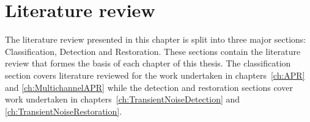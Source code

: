 \chapter{Literature review}\label{ch:LiteratureReview}

\ifpdf
    \graphicspath{{Chapter2_LitReview/Chapter2Figs/PNG/}{Chapter2_LitReview/Chapter2Figs/PDF/}{Chapter2_LitReview/Chapter2Figs/}{Chapter2_LitReview/Chapter2Figs/Classification/}{Chapter2_LitReview/Chapter2Figs/Detection/}{Chapter2_LitReview/Chapter2Figs/Restoration}}
\else
    \graphicspath{{Chapter2_LitReview/Chapter2Figs/EPS/}{Chapter2_LitReview/Chapter2Figs/}}
\fi

The literature review presented in this chapter is split into three major sections: Classification, Detection and Restoration. These sections contain the literature review that formes the basis of each chapter of this thesis. The classification section covers literature reviewed for the work undertaken in chapters~\ref{ch:APR} and \ref{ch:MultichannelAPR} while the detection and restoration sections cover work undertaken in chapters~\ref{ch:TransientNoiseDetection} and \ref{ch:TransientNoiseRestoration}.

